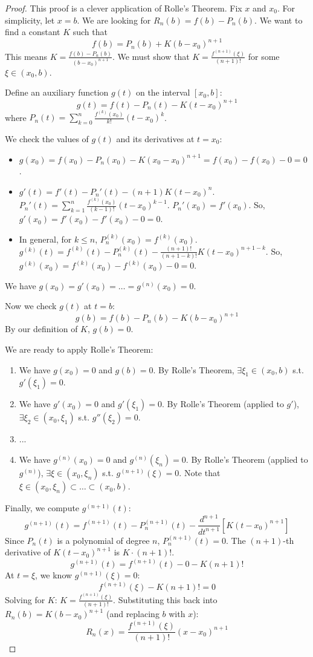 \documentclass[oneside]{book}
\begin{document}
\begin{proof}
This proof is a clever application of Rolle's Theorem.
Fix $x$ and $x_0$. For simplicity, let $x=b$. We are looking for $R_n(b) = f(b) - P_n(b)$.
We want to find a constant $K$ such that
\[
f(b) = P_n(b) + K(b-x_0)^{n+1}
\]
This means $K = \frac{f(b) - P_n(b)}{(b-x_0)^{n+1}}$. We must show that $K = \frac{f^{(n+1)}(\xi)}{(n+1)!}$ for some $\xi \in (x_0, b)$.

Define an auxiliary function $g(t)$ on the interval $[x_0, b]$:
\[
g(t) = f(t) - P_n(t) - K(t-x_0)^{n+1}
\]
where $P_n(t) = \sum_{k=0}^n \frac{f^{(k)}(x_0)}{k!} (t-x_0)^k$.

We check the values of $g(t)$ and its derivatives at $t=x_0$:
\begin{itemize}
    \item $g(x_0) = f(x_0) - P_n(x_0) - K(x_0-x_0)^{n+1} = f(x_0) - f(x_0) - 0 = 0$.
    \item $g'(t) = f'(t) - P_n'(t) - (n+1)K(t-x_0)^n$.
    $P_n'(t) = \sum_{k=1}^n \frac{f^{(k)}(x_0)}{(k-1)!} (t-x_0)^{k-1}$.
    $P_n'(x_0) = f'(x_0)$. So, $g'(x_0) = f'(x_0) - f'(x_0) - 0 = 0$.
    \item In general, for $k \leq n$, $P_n^{(k)}(x_0) = f^{(k)}(x_0)$.
    $g^{(k)}(t) = f^{(k)}(t) - P_n^{(k)}(t) - \frac{(n+1)!}{(n+1-k)!}K(t-x_0)^{n+1-k}$.
    So, $g^{(k)}(x_0) = f^{(k)}(x_0) - f^{(k)}(x_0) - 0 = 0$.
\end{itemize}
We have $g(x_0) = g'(x_0) = \dots = g^{(n)}(x_0) = 0$.

Now we check $g(t)$ at $t=b$:
\[
g(b) = f(b) - P_n(b) - K(b-x_0)^{n+1}
\]
By our definition of $K$, $g(b) = 0$.

We are ready to apply Rolle's Theorem:
\begin{enumerate}
    \item We have $g(x_0) = 0$ and $g(b) = 0$. By Rolle's Theorem, $\exists \xi_1 \in (x_0, b)$ s.t. $g'(\xi_1) = 0$.
    \item We have $g'(x_0) = 0$ and $g'(\xi_1) = 0$. By Rolle's Theorem (applied to $g'$), $\exists \xi_2 \in (x_0, \xi_1)$ s.t. $g''(\xi_2) = 0$.
    \item ...
    \item We have $g^{(n)}(x_0) = 0$ and $g^{(n)}(\xi_n) = 0$. By Rolle's Theorem (applied to $g^{(n)}$), $\exists \xi \in (x_0, \xi_n)$ s.t. $g^{(n+1)}(\xi) = 0$.
    Note that $\xi \in (x_0, \xi_n) \subset \dots \subset (x_0, b)$.
\end{enumerate}
Finally, we compute $g^{(n+1)}(t)$:
\[
g^{(n+1)}(t) = f^{(n+1)}(t) - P_n^{(n+1)}(t) - \frac{d^{n+1}}{dt^{n+1}}[K(t-x_0)^{n+1}]
\]
Since $P_n(t)$ is a polynomial of degree $n$, $P_n^{(n+1)}(t) = 0$.
The $(n+1)$-th derivative of $K(t-x_0)^{n+1}$ is $K \cdot (n+1)!$.
\[
g^{(n+1)}(t) = f^{(n+1)}(t) - 0 - K(n+1)!
\]
At $t=\xi$, we know $g^{(n+1)}(\xi) = 0$:
\[
f^{(n+1)}(\xi) - K(n+1)! = 0
\]
Solving for $K$: $K = \frac{f^{(n+1)}(\xi)}{(n+1)!}$.
Substituting this back into $R_n(b) = K(b-x_0)^{n+1}$ (and replacing $b$ with $x$):
\[
R_n(x) = \frac{f^{(n+1)}(\xi)}{(n+1)!} (x-x_0)^{n+1}
\]
\end{proof}
\end{document}
